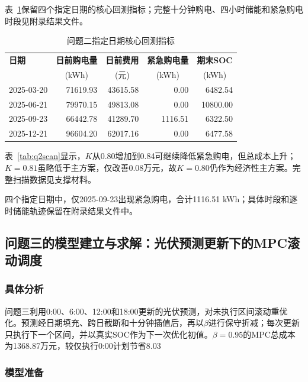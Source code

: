 \documentclass{cumcmthesis}
\begin{document}
表~\ref{tab:q2datesummary}保留四个指定日期的核心回测指标；完整十分钟购电、四小时储能和紧急购电时段见附录结果文件。

\begin{table}[H]
\centering
\normalsize
\setlength{\tabcolsep}{8pt}
\renewcommand\arraystretch{1.3}
\caption{问题二指定日期核心回测指标}
\label{tab:q2datesummary}
\begin{tabular}{lrrrr}
\toprule
\textbf{日期} & \textbf{日前购电量} & \textbf{日前费用} & \textbf{紧急购电量} & \textbf{期末SOC}\\
& \multicolumn{1}{c}{(kWh)} & \multicolumn{1}{c}{(元)} & \multicolumn{1}{c}{(kWh)} & \multicolumn{1}{c}{(kWh)}\\
\midrule
2025-03-20 & 71619.93 & 43615.58 & 0.00 & 6482.54\\
2025-06-21 & 79970.15 & 49813.08 & 0.00 & 10800.00\\
2025-09-23 & 66442.78 & 41289.70 & 1116.51 & 6322.50\\
2025-12-21 & 96604.20 & 62017.16 & 0.00 & 6477.58\\
\bottomrule
\end{tabular}
\end{table}

表~\ref{tab:q2scan}显示，$K$从0.80增加到0.84可继续降低紧急购电，但总成本上升；$K=0.81$虽略低于主方案，仅改善0.08万元，故$K=0.80$仍作为经济性主方案。完整扫描数据见支撑材料。

四个指定日期中，仅2025-09-23出现紧急购电，合计1116.51 kWh；具体时段和逐时储能轨迹保留在附录结果文件中。

\subsection{问题三的模型建立与求解：光伏预测更新下的MPC滚动调度}

\subsubsection{具体分析}

问题三利用0:00、6:00、12:00和18:00更新的光伏预测，对未执行区间滚动重优化。预测经日期填充、跨日截断和十分钟插值后，再以$\beta$进行保守折减；每次更新只执行下一个区间，并以真实SOC作为下一次优化初值。$\beta=0.95$的MPC总成本为1368.87万元，较仅执行0:00计划节省8.03%

\subsubsection{模型准备}
\end{document}
